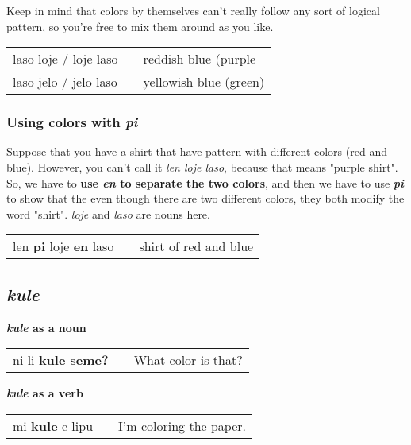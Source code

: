 Keep in mind that colors by themselves can't really follow any sort of logical pattern, so you're free to mix them around as you like. 

\begin{supertabular}{p{5,5cm}|ll}
laso loje / loje laso && reddish blue (purple \\
laso jelo / jelo laso && yellowish blue (green) \\
\end{supertabular} 
%
%
\subsubsection*{Using colors with \textit{pi}}
%
Suppose that you have a shirt that have pattern with different colors (red and blue). 
However, you can't call it \textit{len loje laso}, because that means "purple shirt". 
So, we have to \textbf{use \textit{en} to separate the two colors}, and then we have to use \textbf{\textit{pi}} to show that the even though there are two different colors, they both modify the word "shirt".
\textit{loje} and \textit{laso} are nouns here. 

\begin{supertabular}{p{5,5cm}|ll}
len \textbf{pi} loje \textbf{en} laso && shirt of red and blue \\
\end{supertabular} 
%
\subsection*{\textit{kule}}
%
\textbf{\textit{kule} as a noun} \\
\begin{supertabular}{p{5,5cm}|ll}
ni li \textbf{kule seme?} && What color is that? \\
\end{supertabular} 

\textbf{\textit{kule} as a verb} \\
\begin{supertabular}{p{5,5cm}|ll}
mi \textbf{kule} e lipu && I'm coloring the paper. \\
\end{supertabular} 
%
\newpage
